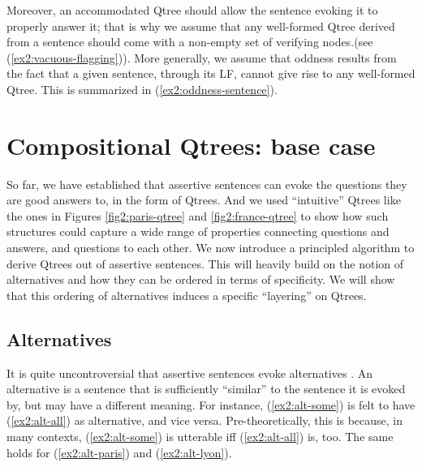 Moreover, an accommodated Qtree should allow the sentence evoking it to properly answer it; that is why we assume that any well-formed Qtree derived from a sentence should come with a non-empty set of verifying nodes.(see (\ref{ex2:vacuous-flagging})). More generally, we assume that oddness results from the fact that a given sentence, through its LF, cannot give rise to any well-formed Qtree. This is summarized in (\ref{ex2:oddness-sentence}).


\begin{exe}
	\label{ex2:vacuous-flagging}
	\label{ex2:oddness-sentence}
\end{exe}



\section{Compositional Qtrees: base case}\label{sec:simplex}

So far, we have established that assertive sentences can evoke the questions they are good answers to, in the form of Qtrees. And we used ``intuitive'' Qtrees like the ones in Figures \ref{fig2:paris-qtree} and \ref{fig2:france-qtree} to show how such structures could capture a wide range of properties connecting questions and answers, and questions to each other. We now introduce a principled algorithm to derive Qtrees out of assertive sentences. This will heavily build on the notion of alternatives and how they can be ordered in terms of specificity. We will show that this ordering of alternatives induces a specific ``layering'' on Qtrees.

\subsection{Alternatives}

It is quite uncontroversial that assertive sentences evoke alternatives \citep{Rooth1992,Katzir2007,Fox2011}. An alternative is a sentence that is sufficiently ``similar'' to the sentence it is evoked by, but may have a different meaning. For instance, (\ref{ex2:alt-some}) is felt to have (\ref{ex2:alt-all}) as alternative, and vice versa. Pre-theoretically, this is because, in many contexts, (\ref{ex2:alt-some}) is utterable iff (\ref{ex2:alt-all}) is, too. The same holds for (\ref{ex2:alt-paris}) and (\ref{ex2:alt-lyon}).

